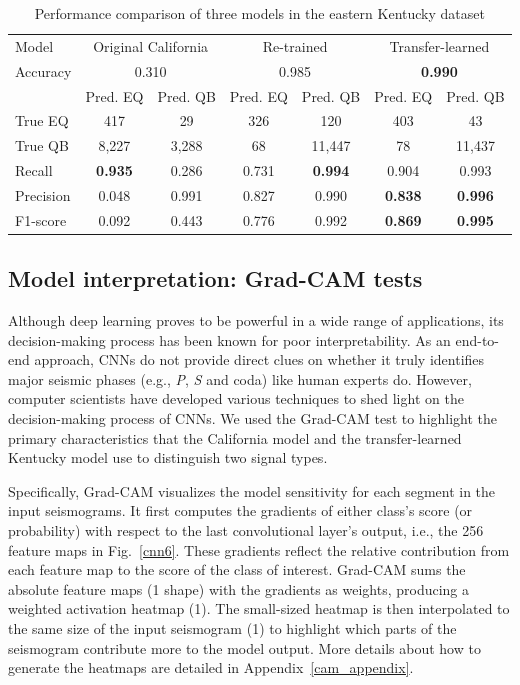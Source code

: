 \documentclass{gji}
\begin{document}
\begin{table}
\caption{Performance comparison of three models in the eastern Kentucky dataset}
\label{performance_comparison}
\begin{tabular}{lcccccc}
\toprule[1pt]
Model&\multicolumn{2}{c}{Original California}&\multicolumn{2}{c}{Re-trained}&\multicolumn{2}{c}{Transfer-learned}\\
Accuracy&\multicolumn{2}{c}{0.310}&\multicolumn{2}{c}{0.985}&\multicolumn{2}{c}{\textbf{0.990}}\\
\hline
&Pred. EQ&Pred. QB&Pred. EQ&Pred. QB&Pred. EQ&Pred. QB\\
True EQ&417&29&326&120&403&43\\
True QB&8,227&3,288&68&11,447&78&11,437\\
Recall&\textbf{0.935}&0.286&0.731&\textbf{0.994}&0.904&0.993\\
Precision&0.048&0.991&0.827&0.990&\textbf{0.838}&\textbf{0.996}\\
F1-score&0.092&0.443&0.776&0.992&\textbf{0.869}&\textbf{0.995}\\
\bottomrule[1pt]
\end{tabular}
\end{table}

\subsection{Model interpretation: Grad-CAM tests}
Although deep learning proves to be powerful in a wide range of applications, its decision-making process has been known for poor interpretability. As an end-to-end approach, CNNs do not provide direct clues on whether it truly identifies major seismic phases (e.g., \textit{P}, \textit{S} and coda) like human experts do. However, computer scientists have developed various techniques to shed light on the decision-making process of CNNs. We used the Grad-CAM test \citep{cam} to highlight the primary characteristics that the California model and the transfer-learned Kentucky model use to distinguish two signal types.

Specifically, Grad-CAM  visualizes the model sensitivity for each segment in the input seismograms. It first computes the gradients of either class’s score (or probability) with respect to the last convolutional layer’s output, i.e., the 256 feature maps in Fig.~\ref{cnn6}. These gradients reflect the relative contribution from each feature map to the score of the class of interest. Grad-CAM sums the absolute feature maps (1 shape) with the gradients as weights, producing a weighted activation heatmap (1). The small-sized heatmap is then interpolated to the same size of the input seismogram (1) to highlight which parts of the seismogram contribute more to the model output. More details about how to generate the heatmaps are detailed in Appendix~\ref{cam_appendix}.
\end{document}

